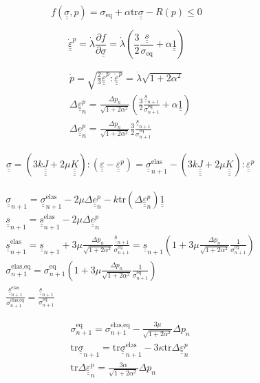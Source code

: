 \documentclass[12pt]{article}
\newcommand\ul[1]{\underline{#1}}
\newcommand\uusigma{\ul{\ul{\sigma}}}
\newcommand\uus{\ul{\ul{s}}}
\newcommand\uue{\ul{\ul{e}}}
\newcommand\uuUnit{\ul{\ul{1}}}
\newcommand\uueps{\ul{\ul{\varepsilon}}}
\newcommand{\uuuuK}{\ul{\ul{\ul{\ul{K}}}}}
\newcommand{\uuuuJ}{\ul{\ul{\ul{\ul{J}}}}}
\newcommand\Deltaepsp{\Delta \uueps_{n}^p}
\newcommand\Deltaep{\Delta \uue_{n}^p}
\newcommand\sigmaeqn{\sigma_{n+1}^\text{eq}}
\newcommand\sigmaeqnelas{\sigma_{n+1}^\text{elas,eq}}
\newcommand\uusn{\uus_{n+1}}
\newcommand\uusnelas{\uus_{n+1}^\text{elas}}
\newcommand\uusigman{\ul{\ul{\sigma}}_{n+1}}
\newcommand\uusigmanelas{\uusigman^{\text{elas}}}
\newcommand\mtr{\mathrm{tr}}
\begin{document}
\begin{equation}
    f(\uusigma, p) = \sigma_{\text{eq}} + \alpha \mtr \uusigma - R(p) \leq 0
\end{equation}

\begin{equation}
    \dot{\uueps}^p = \dot{\lambda} \frac{\partial f}{\partial \uusigma} = \dot{\lambda} \left(\frac{3}{2} \frac{\uus}{\sigma_\text{eq}} + \alpha \uuUnit \right)
\end{equation}

\begin{align}
    & \dot{p} = \sqrt{\frac{2}{3} \dot{\uueps}^p : \dot{\uueps}^p} = \dot{\lambda}\sqrt{1 + 2\alpha^2} \\
    & \Deltaepsp = \frac{\Delta p_n}{\sqrt{1 + 2\alpha^2}} \left( \frac{3}{2} \frac{\uusn}{\sigmaeqn} + \alpha \uuUnit \right) \\
    & \Deltaep = \frac{\Delta p_n}{\sqrt{1 + 2\alpha^2}} \frac{3}{2} \frac{\uusn}{\sigmaeqn} 
\end{align}

\begin{align}
    & \uusigma = (3k\uuuuJ + 2\mu\uuuuK) : (\uueps - \uueps^p) = \uusigma_{n+1}^\text{elas} - (3k\uuuuJ + 2\mu\uuuuK) : \uueps^p
\end{align}

\begin{align}
    & \uusigma_{n+1} = \uusigma_{n+1}^\text{elas} - 2\mu \Deltaep - k \mtr (\Deltaepsp) \uuUnit \\
    & \uus_{n+1} = \uus_{n+1}^\text{elas} - 2\mu\Deltaep \\
    & \uus_{n+1}^\text{elas} = \uus_{n+1} + 3\mu\frac{\Delta p_n}{\sqrt{1 + 2\alpha^2}} \frac{\uusn}{\sigmaeqn} = \uus_{n+1} (1 +  3\mu\frac{\Delta p_n}{\sqrt{1 + 2\alpha^2}} \frac{1}{\sigmaeqn}) \\
    & \sigmaeqnelas = \sigmaeqn (1 +  3\mu\frac{\Delta p_n}{\sqrt{1 + 2\alpha^2}} \frac{1}{\sigmaeqn}) \\
    & \frac{\uusnelas}{\sigmaeqnelas} = \frac{\uusn}{\sigmaeqn}
\end{align}

\begin{align}
    & \sigmaeqn = \sigmaeqnelas - \frac{3\mu}{\sqrt{1 + 2\alpha^2}}\Delta p_n \\
    & \mtr \uusigman = \mtr \uusigmanelas - 3\kappa \mtr \Deltaepsp \\
    & \mtr \Deltaepsp = \frac{3\alpha}{\sqrt{1 + 2\alpha^2}} \Delta p_n
\end{align}
\end{document}
